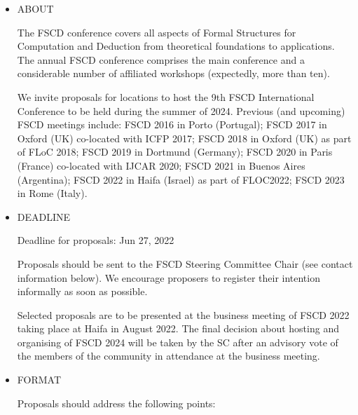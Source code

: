 \documentclass[prodmode,acmtecs]{acmsmall} %
\begin{document}
\begin{itemize}\item  ABOUT 
 
  The FSCD conference covers all aspects of Formal Structures for Computation and Deduction from theoretical foundations to applications. The annual FSCD conference comprises the main conference and a considerable number of affiliated workshops (expectedly, more than ten). 
 
  We invite proposals for locations to host the 9th FSCD International Conference to be held during the summer of 2024. Previous (and upcoming) FSCD meetings include: FSCD 2016 in Porto (Portugal); FSCD 2017 in Oxford (UK) co-located with ICFP 2017; FSCD 2018 in Oxford (UK) as part of FLoC 2018; FSCD 2019 in Dortmund (Germany); FSCD 2020 in Paris (France) co-located with IJCAR 2020; FSCD 2021 in Buenos Aires (Argentina); FSCD 2022 in Haifa (Israel) as part of FLOC2022; FSCD 2023 in Rome (Italy).  
 
\item  DEADLINE 
 
Deadline for proposals: Jun 27, 2022 
 
  Proposals should be sent to the FSCD Steering Committee Chair (see contact information below). We encourage proposers to register their intention informally as soon as possible. 
 
  Selected proposals are to be presented at the business meeting of FSCD 2022 taking place at Haifa in August 2022. The final decision about hosting and organising of FSCD 2024 will be taken by the SC after an advisory vote of the members of the community in attendance at the business meeting.  
 
\item  FORMAT 
 
  Proposals should address the following points: 
 

\end{itemize}
\end{document}

